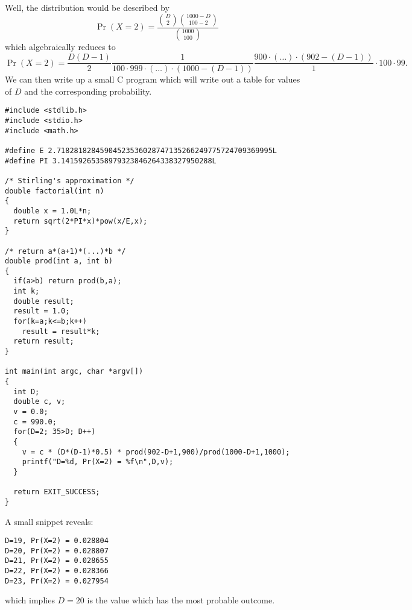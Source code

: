 Well, the distribution would be described by
\begin{equation}
\Pr(X=2)=\frac{\binom{D}{2}\binom{1000-D}{100-2}}{\binom{1000}{100}}
\end{equation}
which algebraically reduces to
\begin{equation}
\Pr(X=2)=\frac{D(D-1)}{2}\frac{1}{100\cdot999\cdot(\dots)\cdot(1000-(D-1))}
\frac{900\cdot(\dots)\cdot(902-(D-1))}{1}\cdot100\cdot99.
\end{equation}
We can then write up a small C program which will write out a table for
values of $D$ and the corresponding probability.
\begin{Verbatim}[fontsize=\small]
#include <stdlib.h>
#include <stdio.h>
#include <math.h>

#define E 2.71828182845904523536028747135266249775724709369995L
#define PI 3.14159265358979323846264338327950288L

/* Stirling's approximation */
double factorial(int n)
{
  double x = 1.0L*n;
  return sqrt(2*PI*x)*pow(x/E,x);
}

/* return a*(a+1)*(...)*b */
double prod(int a, int b)
{
  if(a>b) return prod(b,a);
  int k;
  double result;
  result = 1.0;
  for(k=a;k<=b;k++)
    result = result*k;
  return result;
}

int main(int argc, char *argv[])
{
  int D;
  double c, v;
  v = 0.0;
  c = 990.0;
  for(D=2; 35>D; D++)
  {
    v = c * (D*(D-1)*0.5) * prod(902-D+1,900)/prod(1000-D+1,1000);
    printf("D=%d, Pr(X=2) = %f\n",D,v);
  }

  return EXIT_SUCCESS;
}
\end{Verbatim}
A small snippet reveals:
\begin{Verbatim}[fontsize=\footnotesize]
D=19, Pr(X=2) = 0.028804
D=20, Pr(X=2) = 0.028807
D=21, Pr(X=2) = 0.028655
D=22, Pr(X=2) = 0.028366
D=23, Pr(X=2) = 0.027954
\end{Verbatim}
which implies $D=20$ is the value which has the most probable outcome.
